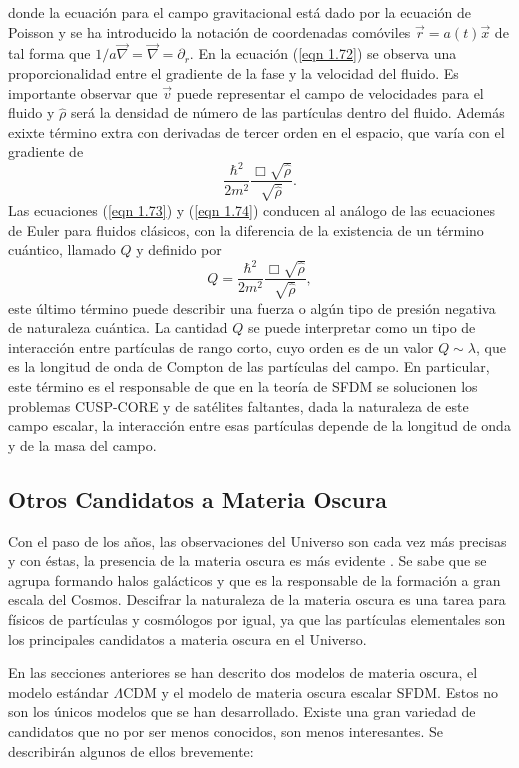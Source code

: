 \documentclass[a4paper,openright,10pt, oneside, final]{book}
\begin{document}
donde la ecuación para el campo gravitacional está dado por la ecuación de Poisson y se ha introducido la notación de coordenadas comóviles $\vec{r} = a(t)\vec{x}$ de tal forma que $1/a\vec{\nabla} = \vec{\nabla} = \partial_{r}$. En la ecuación (\ref{eqn 1.72}) se observa una proporcionalidad entre el gradiente de la fase y la velocidad del fluido. Es importante observar que $\vec{v}$ puede representar el campo de velocidades para el fluido y $\hat{\rho}$ será la densidad de número de las partículas dentro del fluido. Además exixte término extra con derivadas de tercer orden en el espacio, que varía con el gradiente de 
\begin{equation*}
\frac{\hbar^{2}}{2m^{2}}\frac{\Box\sqrt{\hat{\rho}}}{\sqrt{\hat{\rho}}}.
\end{equation*}
Las ecuaciones (\ref{eqn 1.73}) y (\ref{eqn 1.74}) conducen al análogo de las ecuaciones de Euler para fluidos clásicos, con la diferencia de la existencia de un término cuántico, llamado $Q$ y definido por
\begin{equation}
Q = \frac{\hbar^{2}}{2m^{2}}\frac{\Box\sqrt{\hat{\rho}}}{\sqrt{\hat{\rho}}},\label{eqn 1.78}
\end{equation}
este último término puede describir una fuerza o algún tipo de presión negativa de naturaleza cuántica. La cantidad $Q$ se puede interpretar como un tipo de interacción entre partículas de rango corto, cuyo orden es de un valor $Q \sim \lambda$, que es la longitud de onda de Compton de las partículas del campo. En particular, este término es el responsable de que en la teoría de SFDM se solucionen los problemas CUSP-CORE y de satélites faltantes, dada la naturaleza de este campo escalar, la interacción entre esas partículas depende de la longitud de onda y de la masa del campo.
\subsection{Otros Candidatos a Materia Oscura}
Con el paso de los años, las observaciones del Universo son cada vez más precisas y con éstas, la presencia de la materia oscura es más evidente \cite{1.3.2.1}. Se sabe que se agrupa formando halos galácticos y que es la responsable de la formación a gran escala del Cosmos. Descifrar la naturaleza de la materia oscura es una tarea para físicos de partículas y cosmólogos por igual, ya que las partículas elementales son los principales candidatos a materia oscura en el Universo. 

En las secciones anteriores se han descrito dos modelos de materia oscura, el modelo estándar $\Lambda$CDM y el modelo de materia oscura escalar SFDM. Estos no son los únicos modelos que se han desarrollado. Existe una gran variedad de candidatos que no por ser menos conocidos, son menos interesantes. Se describirán algunos de ellos brevemente:
\end{document}

